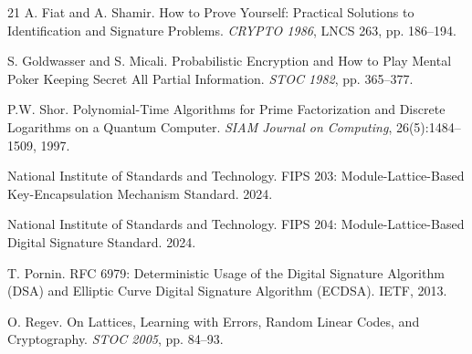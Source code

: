 \documentclass[11pt,a4paper]{article}
\begin{document}
\begin{thebibliography}{21}
 A. Fiat and A. Shamir. How to Prove Yourself: Practical Solutions to Identification and Signature Problems. \textit{CRYPTO 1986}, LNCS 263, pp. 186--194.

 S. Goldwasser and S. Micali. Probabilistic Encryption and How to Play Mental Poker Keeping Secret All Partial Information. \textit{STOC 1982}, pp. 365--377.

 P.W. Shor. Polynomial-Time Algorithms for Prime Factorization and Discrete Logarithms on a Quantum Computer. \textit{SIAM Journal on Computing}, 26(5):1484--1509, 1997.

 National Institute of Standards and Technology. FIPS 203: Module-Lattice-Based Key-Encapsulation Mechanism Standard. 2024.

 National Institute of Standards and Technology. FIPS 204: Module-Lattice-Based Digital Signature Standard. 2024.

 T. Pornin. RFC 6979: Deterministic Usage of the Digital Signature Algorithm (DSA) and Elliptic Curve Digital Signature Algorithm (ECDSA). IETF, 2013.

 O. Regev. On Lattices, Learning with Errors, Random Linear Codes, and Cryptography. \textit{STOC 2005}, pp. 84--93.

\end{thebibliography}
\end{document}
